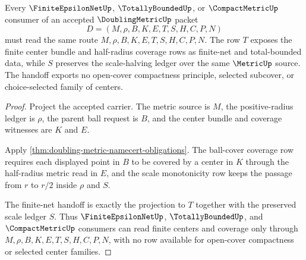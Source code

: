 \begin{theorem}
\label{thm:doubling-metric-finite-net-handoff}
Every $\FiniteEpsilonNetUp$, $\TotallyBoundedUp$, or $\CompactMetricUp$ consumer of an accepted $\DoublingMetricUp$ packet
$$
D=(M,\rho,B,K,E,T,S,H,C,P,N)
$$
must read the same route $M,\rho,B,K,E,T,S,H,C,P,N$. The row $T$ exposes the finite center bundle and half-radius coverage rows as finite-net and total-bounded data, while $S$ preserves the scale-halving ledger over the same $\MetricUp$ source. The handoff exports no open-cover compactness principle, selected subcover, or choice-selected family of centers.
\end{theorem}
\begin{proof}
Project the accepted carrier. The metric source is $M$, the positive-radius ledger is $\rho$, the parent ball request is $B$, and the center bundle and coverage witnesses are $K$ and $E$.

Apply \autoref{thm:doubling-metric-namecert-obligations}. The ball-cover coverage row requires each displayed point in $B$ to be covered by a center in $K$ through the half-radius metric read in $E$, and the scale monotonicity row keeps the passage from $r$ to $r/2$ inside $\rho$ and $S$.

The finite-net handoff is exactly the projection to $T$ together with the preserved scale ledger $S$. Thus $\FiniteEpsilonNetUp$, $\TotallyBoundedUp$, and $\CompactMetricUp$ consumers can read finite centers and coverage only through $M,\rho,B,K,E,T,S,H,C,P,N$, with no row available for open-cover compactness or selected center families.
\end{proof}




